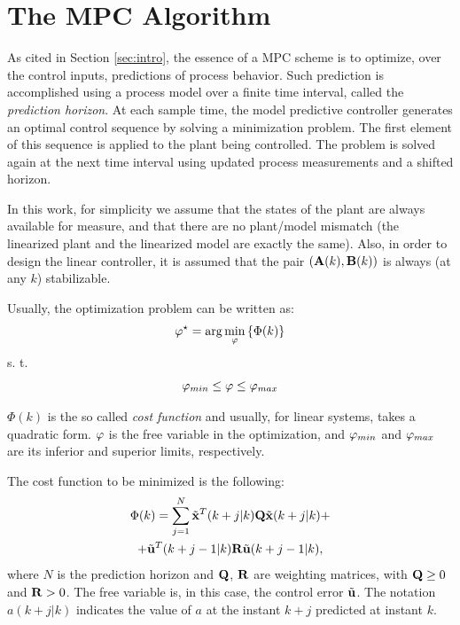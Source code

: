 \documentclass[twocolumn]{IEEEtran} %
\begin{document}
\section{The MPC Algorithm}\label{sec:mpc}
As cited in Section \ref{sec:intro}, the essence of a MPC scheme is to optimize, over the control inputs, predictions of process behavior. Such prediction is accomplished using a process model over a finite time interval, called the {\em prediction horizon}. At each sample time, the model predictive controller generates an optimal control sequence by solving a minimization problem. The first element of this sequence is applied to the plant being controlled. The problem is solved again at the next time interval using updated process measurements and a shifted horizon.

In this work, for simplicity we assume that the states of the plant are always available for measure, and that there are no plant/model mismatch (the linearized plant and the linearized model are exactly the same). Also, in order to design the linear controller, it is assumed that the pair $({\bf A}(k),{\bf B}(k))$ is always (at any $k$) stabilizable.

Usually, the optimization problem can be written as:
\begin{equation*}
	\varphi^\star = \arg\min_{\bf\varphi}\left\{\Phi(k)\right\}
\end{equation*}
s. t.
\begin{equation*}\label{eqn:constr}
	{\bf\varphi}_{min} \leq {\bf\varphi} \leq {\bf\varphi}_{max}
\end{equation*}

$\Phi(k)$ is the so called {\em cost function} and usually, for linear systems, takes a quadratic form. ${\bf\varphi}$ is the free variable in the optimization, and ${\bf\varphi}_{min}$ and ${\bf\varphi}_{max}$ are its inferior and superior limits, respectively.

The cost function to be minimized is the following:
\begin{multline}\label{eqn:cost}
	\Phi(k) = \sum_{j=1}^{N}\tilde{\bf x}^T(k+j|k){\bf Q}\tilde{\bf x}(k+j|k) + \\ + \tilde{\bf u}^T(k+j-1|k){\bf R}\tilde{\bf u}(k+j-1|k),
\end{multline}
where $N$ is the prediction horizon and ${\bf Q}$, ${\bf R}$ are weighting matrices, with ${\bf Q}\geq 0$ and ${\bf R}>0$. The free variable is, in this case, the control error $\tilde{\bf u}$. The notation $a(k+j|k)$ indicates the value of $a$ at the instant $k+j$ predicted at instant $k$.
\end{document}
